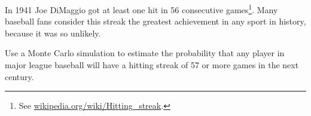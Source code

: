 \documentclass[12pt]{book}
\begin{document}
\begin{ex}


In 1941 Joe DiMaggio got at least one hit
in 56 consecutive games\footnote{See
  \url{wikipedia.org/wiki/Hitting_streak}.}.  Many baseball fans
consider this streak the greatest achievement in any sport in history,
because it was so unlikely.


Use a Monte Carlo simulation to estimate the probability that
any player in major league baseball will have a hitting streak
of 57 or more games in the next century.

\end{ex}
\end{document}
